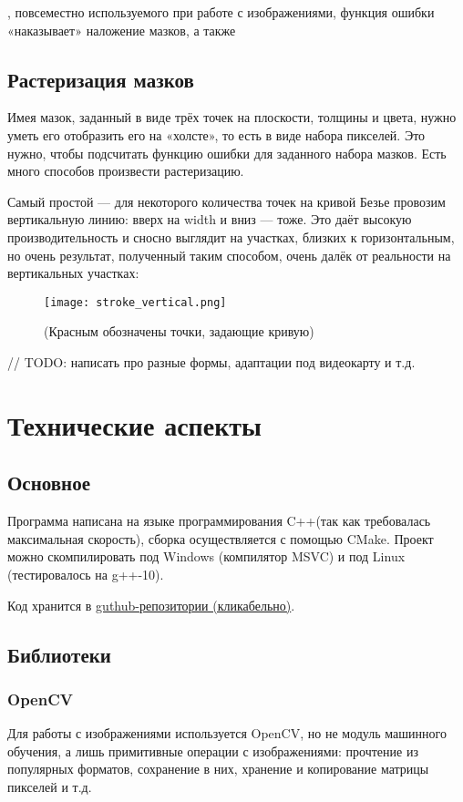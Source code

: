 \documentclass[11pt]{article}
\begin{document}
    , повсеместно используемого при работе с изображениями, функция ошибки «наказывает» наложение мазков, а также

    \subsection{Растеризация мазков}\label{subsec:rasterization}
    Имея мазок, заданный в виде трёх точек на плоскости, толщины и цвета, нужно уметь его отобразить его на «холсте», то есть в виде набора пикселей.
    Это нужно, чтобы подсчитать функцию ошибки для заданного набора мазков.
    Есть много способов произвести растеризацию.

    Самый простой — для некоторого количества точек на кривой Безье провозим вертикальную линию: вверх на width и  вниз — тоже.
    Это даёт высокую производительность и сносно выглядит на участках, близких к горизонтальным, но очень результат, полученный таким способом, очень далёк от реальности на вертикальных участках:
    \begin{figure}[h!]
        \centering
        \texttt{[image: stroke\_vertical.png]}
        \caption{(Красным обозначены точки, задающие кривую)}
        \label{fig:vertical_stroke}
    \end{figure}


    // TODO: написать про разные формы, адаптации под видеокарту и т.д.

    \section{Технические аспекты}\label{sec:tecnical}

    \subsection{Основное}\label{subsec:major}
    Программа написана на языке программирования C++(так как требовалась максимальная скорость), сборка осуществляется с помощью CMake.
    Проект можно скомпилировать под Windows (компилятор MSVC) и под Linux (тестировалось на g++-10).

    Код хранится в \href{https://github.com/donRumata03/Painter}{guthub-репозитории (кликабельно)}.

    \subsection{Библиотеки}\label{subsec:libs}

    \subsubsection{OpenCV}
    Для работы с изображениями используется OpenCV, но не модуль машинного обучения, а лишь примитивные операции с изображениями:
    прочтение из популярных форматов, сохранение в них, хранение и копирование матрицы пикселей и т.д.
\end{document}
